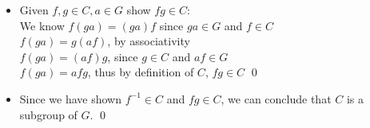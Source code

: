 \documentclass[11pt]{article}
\begin{document}
\begin{enumerate}
\begin{itemize}
	  \item Given $f,g \in C, a \in G$ show $fg \in C$: \\
	  We know $f(ga) = (ga)f$ since $ga \in G$ and $f \in C$ \\
	  $f(ga) = g(af)$, by associativity \\
	  $f(ga) = (af)g$, since $g \in C$ and $af \in G$ \\
	  $f(ga) = afg$, thus by definition of $C$, $fg \in C$ \qed \\
	  
	  \item Since we have shown $f^{-1} \in C$ and $fg \in C$, we can conclude that $C$ is a subgroup of $G$. \qed
  
  \end{itemize}


\end{enumerate}
\end{document}
